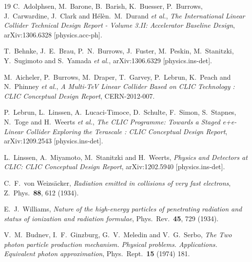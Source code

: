 \documentclass[12pt]{book}
\begin{document}
\begin{thebibliography}{19}
  C.~Adolphsen, M.~Barone, B.~Barish, K.~Buesser, P.~Burrows, J.~Carwardine, J.~Clark and H\'{e}l\`{e}n.~M.~Durand {\it et al.},
  {\em The International Linear Collider Technical Design Report -
    Volume 3.II: Accelerator Baseline Design},
  arXiv:1306.6328 [physics.acc-ph].

  T.~Behnke, J.~E.~Brau, P.~N.~Burrows, J.~Fuster, M.~Peskin, M.~Stanitzki, Y.~Sugimoto and S.~Yamada {\it et al.},
  arXiv:1306.6329 [physics.ins-det].

  M.~Aicheler, P.~Burrows, M.~Draper, T.~Garvey, P.~Lebrun, K.~Peach and N.~Phinney {\it et al.},
  {\em A Multi-TeV Linear Collider Based on CLIC Technology : CLIC
    Conceptual Design Report},
  CERN-2012-007.

  P.~Lebrun, L.~Linssen, A.~Lucaci-Timoce, D.~Schulte, F.~Simon, S.~Stapnes, N.~Toge and H.~Weerts {\it et al.},
  {\em The CLIC Programme: Towards a Staged e+e- Linear Collider
    Exploring the Terascale : CLIC Conceptual Design Report},
  arXiv:1209.2543 [physics.ins-det].

  L.~Linssen, A.~Miyamoto, M.~Stanitzki and H.~Weerts,
  {\em Physics and Detectors at CLIC: CLIC Conceptual Design Report},
  arXiv:1202.5940 [physics.ins-det].

  C.~F.~von Weizs\"acker,
  {\em Radiation emitted in collisions of very fast electrons},
  Z.\ Phys.\  {\bf 88}, 612 (1934).

  E.~J.~Williams,
  {\em Nature of the high-energy particles of penetrating radiation
    and status of ionization and radiation formulae},
  Phys.\ Rev.\  {\bf 45}, 729 (1934).

  V.~M.~Budnev, I.~F.~Ginzburg, G.~V.~Meledin and V.~G.~Serbo,
  {\em The Two photon particle production mechanism. Physical problems.
  Applications. Equivalent photon approximation},
  Phys.\ Rept.\  {\bf 15} (1974) 181.


\end{thebibliography}
\end{document}
